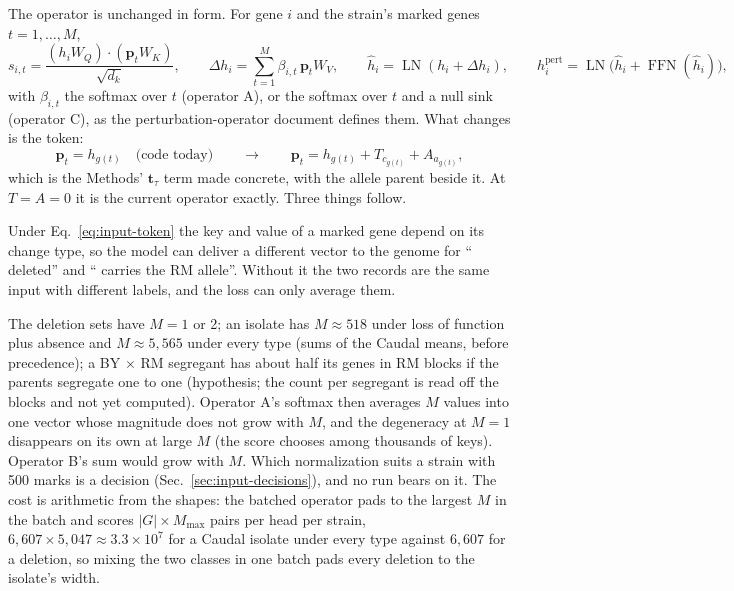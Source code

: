 The operator is unchanged in form. For gene $i$ and the strain's marked genes
$t=1,\dots,M$,
\begin{equation}
s_{i,t}=\frac{(h_iW_Q)\cdot(\mathbf{p}_tW_K)}{\sqrt{d_k}},\qquad
\Delta h_i=\sum_{t=1}^{M}\beta_{i,t}\,\mathbf{p}_tW_V,\qquad
\hat h_i=\operatorname{LN}(h_i+\Delta h_i),\qquad
h_i^{\mathrm{pert}}=\operatorname{LN}\!\big(\hat h_i+\operatorname{FFN}(\hat h_i)\big),
\label{eq:input-block}
\end{equation}
with $\beta_{i,t}$ the softmax over $t$ (operator A), or the softmax over $t$ and a null
sink (operator C), as the perturbation-operator document defines them. What changes is
the token:
\begin{equation}
\mathbf{p}_t=h_{g(t)}\quad\text{(code today)}\qquad\longrightarrow\qquad
\mathbf{p}_t=h_{g(t)}+T_{c_{g(t)}}+A_{a_{g(t)}},
\label{eq:input-token}
\end{equation}
which is the Methods' $\mathbf{t}_\tau$ term made concrete, with the allele parent
beside it. At $T=A=0$ it is the current operator exactly. Three things follow.

 Under
Eq.~\ref{eq:input-token} the key and value of a marked gene depend on its change type,
so the model can deliver a different vector to the genome for `` deleted''
and `` carries the RM allele''. Without it the two records are the same
input with different labels, and the loss can only average them.

 The deletion sets have $M=1$ or
2; an isolate has $M\approx 518$ under loss of function plus absence and
$M\approx 5{,}565$ under every type (sums of the Caudal means, before precedence); a
BY $\times$ RM segregant has about half its genes in RM blocks if the parents segregate
one to one (hypothesis; the count per segregant is read off the blocks and not yet
computed). Operator A's softmax then averages $M$ values into one vector whose
magnitude does not grow with $M$, and the degeneracy at $M=1$ disappears on its own at
large $M$ (the score chooses among thousands of keys). Operator B's sum would grow
with $M$. Which normalization suits a strain with 500 marks is a decision
(Sec.~\ref{sec:input-decisions}), and no run bears on it. The cost is arithmetic from
the shapes: the batched operator pads to the largest $M$ in the batch and scores
$|G|\times M_{\max}$ pairs per head per strain, $6{,}607\times 5{,}047\approx 3.3\times 10^{7}$
for a Caudal isolate under every type against $6{,}607$ for a deletion, so mixing the two
classes in one batch pads every deletion to the isolate's width.

